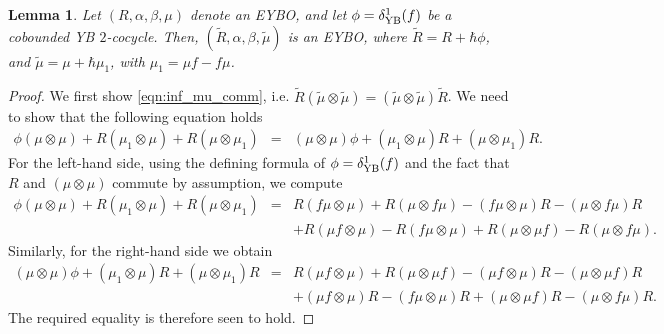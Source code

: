 \documentclass[11pt,fleqn]{amsart} %
\newtheorem{lemma}[theorem]{Lemma}
\begin{document}
		\begin{lemma}\label{lem:cob_EYBO}
					Let $(R,\alpha,\beta,\mu)$ denote an EYBO, and let $\phi = \delta^1_{\rm YB}(f)$ be a cobounded YB $2$-cocycle. Then, $(\tilde R, \alpha, \beta, \tilde \mu)$ is an EYBO, where $\tilde R = R + \hbar \phi$, and $\tilde \mu = \mu + \hbar \mu_1$, with $\mu_1 = \mu f - f\mu$. 
		\end{lemma}
		\begin{proof}
					We first show \eqref{eqn:inf_mu_comm}, i.e. $\tilde R(\tilde \mu\otimes \tilde \mu) = (\tilde \mu\otimes \tilde \mu)\tilde R$. We need to show that the following equation holds
					\begin{eqnarray*}
							\phi(\mu\otimes \mu) + R(\mu_1\otimes \mu) + R(\mu\otimes \mu_1) &=& (\mu\otimes \mu)\phi + (\mu_1\otimes \mu)R + (\mu\otimes \mu_1)R. 
					\end{eqnarray*}
		For the left-hand side, using
		 the defining formula of  $\phi = \delta^1_{\rm YB}(f)$ and 
		 the fact that $R$ and $(\mu\otimes \mu)$ commute by assumption, we compute
		\begin{eqnarray*}
				\phi(\mu\otimes \mu) + R(\mu_1\otimes \mu) + R(\mu\otimes \mu_1) &=& R(f\mu\otimes \mu) + R(\mu\otimes f\mu) - (f\mu\otimes \mu)R - (\mu\otimes f\mu)R \\
				&& + R(\mu f\otimes \mu)  - R(f\mu \otimes \mu) + R(\mu\otimes \mu f) - R(\mu\otimes f\mu).
		\end{eqnarray*}
		Similarly, for the right-hand side we obtain
		\begin{eqnarray*}
				(\mu\otimes \mu)\phi + (\mu_1\otimes \mu)R + (\mu\otimes \mu_1)R &=& R(\mu f\otimes \mu) + R(\mu\otimes \mu f) - (\mu f\otimes \mu)R - (\mu\otimes \mu f)R\\
				&& + (\mu f\otimes \mu)R - (f\mu \otimes \mu)R + (\mu \otimes \mu f)R - (\mu\otimes f\mu)R. 
		\end{eqnarray*}
		The required equality is therefore seen to hold. 


\end{proof}
\end{document}
